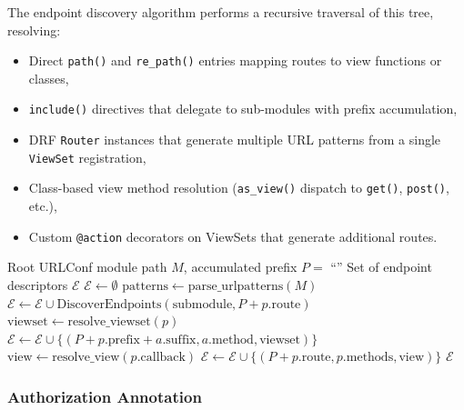 The endpoint discovery algorithm performs a recursive traversal of this tree, resolving:
\begin{itemize}
    \item Direct \texttt{path()} and \texttt{re\_path()} entries mapping routes to view functions or classes,
    \item \texttt{include()} directives that delegate to sub-modules with prefix accumulation,
    \item DRF \texttt{Router} instances that generate multiple URL patterns from a single \texttt{ViewSet} registration,
    \item Class-based view method resolution (\texttt{as\_view()} dispatch to \texttt{get()}, \texttt{post()}, etc.),
    \item Custom \texttt{@action} decorators on ViewSets that generate additional routes.
\end{itemize}

\begin{algorithm}
\caption{Endpoint Discovery via URLConf Traversal}
\label{alg:endpoint-discovery}
\begin{algorithmic}[1]
\REQUIRE Root URLConf module path $M$, accumulated prefix $P = $ ``''
\ENSURE Set of endpoint descriptors $\mathcal{E}$
\STATE $\mathcal{E} \leftarrow \emptyset$
\STATE $\text{patterns} \leftarrow \text{parse\_urlpatterns}(M)$
        \STATE $\mathcal{E} \leftarrow \mathcal{E} \cup \text{DiscoverEndpoints}(\text{submodule}, P + p.\text{route})$
        \STATE $\text{viewset} \leftarrow \text{resolve\_viewset}(p)$
            \STATE $\mathcal{E} \leftarrow \mathcal{E} \cup \{(P + p.\text{prefix} + a.\text{suffix}, a.\text{method}, \text{viewset})\}$
        \ENDFOR
    \ELSE
        \STATE $\text{view} \leftarrow \text{resolve\_view}(p.\text{callback})$
        \STATE $\mathcal{E} \leftarrow \mathcal{E} \cup \{(P + p.\text{route}, p.\text{methods}, \text{view})\}$
    \ENDIF
\ENDFOR
\RETURN $\mathcal{E}$
\end{algorithmic}
\end{algorithm}

\subsubsection{Authorization Annotation}

